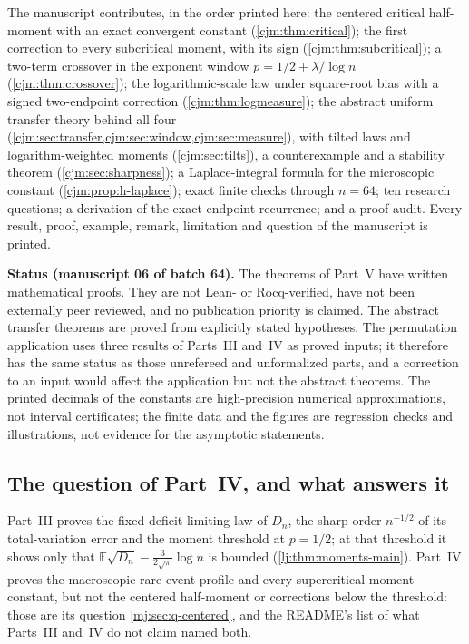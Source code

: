 \documentclass[11pt,a4paper]{article}
\theoremstyle{definition}\newaliascnt{definition}{theorem}
\theoremstyle{remark}\newaliascnt{remark}{theorem}
\newcommand{\ljE}{\mathbb E}
\begin{document}
The manuscript contributes, in the order printed here: the centered
critical half-moment with an exact convergent constant
(\cref{cjm:thm:critical}); the first correction to every subcritical
moment, with its sign (\cref{cjm:thm:subcritical}); a two-term crossover in
the exponent window $p=1/2+\lambda/\log n$ (\cref{cjm:thm:crossover}); the
logarithmic-scale law under square-root bias with a signed two-endpoint
correction (\cref{cjm:thm:logmeasure}); the abstract uniform transfer
theory behind all four (\cref{cjm:sec:transfer,cjm:sec:window,cjm:sec:measure}),
with tilted laws and logarithm-weighted moments (\cref{cjm:sec:tilts}), a
counterexample and a stability theorem (\cref{cjm:sec:sharpness}); a
Laplace-integral formula for the microscopic constant
(\cref{cjm:prop:h-laplace}); exact finite checks through $n=64$; ten
research questions; a derivation of the exact endpoint recurrence; and a
proof audit. Every result, proof, example, remark, limitation and question of
the manuscript is printed.

\begin{resultbox}
\textbf{Status (manuscript 06 of batch 64).} The theorems of Part~V have
written mathematical proofs. They are not Lean- or Rocq-verified, have not
been externally peer reviewed, and no publication priority is claimed. The
abstract transfer theorems are proved from explicitly stated hypotheses. The
permutation application uses three results of Parts~III and~IV as proved
inputs; it therefore has the same status as those unrefereed and unformalized
parts, and a correction to an input would affect the application but not the
abstract theorems. The printed decimals of the constants are high-precision
numerical approximations, not interval certificates; the finite data and the
figures are regression checks and illustrations, not evidence for the
asymptotic statements.
\end{resultbox}

\subsection{The question of Part~IV, and what answers it}
Part~III proves the fixed-deficit limiting law of $D_n$, the sharp order
$n^{-1/2}$ of its total-variation error and the moment threshold at $p=1/2$;
at that threshold it shows only that
$\ljE\sqrt{D_n}-\frac3{2\sqrt\pi}\log n$ is bounded
(\cref{lj:thm:moments-main}). Part~IV proves the macroscopic rare-event
profile and every supercritical moment constant, but not the centered
half-moment or corrections below the threshold: those are its question
\cref{mj:sec:q-centered}, and the README's list of what Parts~III and~IV do
not claim named both.
\end{document}
